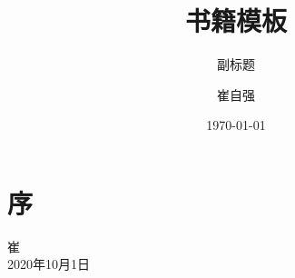 \documentclass[cn,11pt,chinese]{elegantbook}
\title{书籍模板}
\subtitle{副标题}
\author{崔自强}
\institute{天津大学自动化学院}
\date{\today}
\begin{document}
\maketitle
\frontmatter

\chapter*{序}




\vskip 1.5cm

\begin{flushright}
崔\\
2020年10月1日
\end{flushright}

\tableofcontents

\mainmatter

% 
\end{document}
